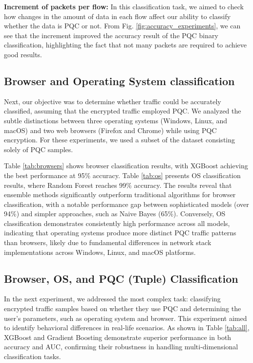 \documentclass[10pt,journal]{IEEEtran}%
\begin{document}
{\bf Increment of packets per flow:} In this classification task, we aimed to check how changes in the amount of data in each flow affect our ability to classify whether the data is PQC or not. From Fig. \ref{fig:accuracy_experiments}, we can see that the increment improved the accuracy result of the PQC binary classification, highlighting the fact that not many packets are required to achieve good results.

\subsection{Browser and Operating System classification}
Next, our objective was to determine whether traffic could be accurately classified, assuming that the encrypted traffic employed PQC. We analyzed the subtle distinctions between three operating systems (Windows, Linux, and macOS) and two web browsers (Firefox and Chrome) while using PQC encryption.  For these experiments, we used a subset of the dataset consisting solely of PQC samples. 


Table \ref{tab:browsers} shows browser classification results, with XGBoost achieving the best performance at 95\% accuracy. Table \ref{tab:os} presents OS classification results, where Random Forest reaches 99\% accuracy. The results reveal that ensemble methods significantly outperform traditional algorithms for browser classification, with a notable performance gap between sophisticated models (over 94\%) and simpler approaches, such as Naive Bayes (65\%). Conversely, OS classification demonstrates consistently high performance across all models, indicating that operating systems produce more distinct PQC traffic patterns than browsers, likely due to fundamental differences in network stack implementations across Windows, Linux, and macOS platforms.





\subsection{Browser, OS, and PQC (Tuple) Classification} In the next experiment, we addressed the most complex task: classifying encrypted traffic samples based on whether they use PQC and determining the user’s parameters, such as operating system and browser. This experiment aimed to identify behavioral differences in real-life scenarios. As shown in Table \ref{tab:all}, XGBoost and Gradient Boosting demonstrate superior performance in both accuracy and AUC, confirming their robustness in handling multi-dimensional classification tasks. 
\end{document}
